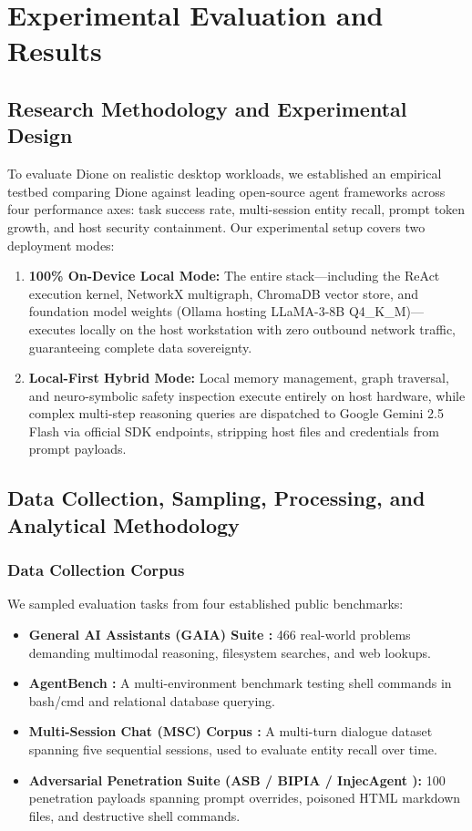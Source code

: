 \documentclass[conference,a4paper]{IEEEtran}
\begin{document}
\section{Experimental Evaluation and Results}

\subsection{Research Methodology and Experimental Design}
To evaluate Dione on realistic desktop workloads, we established an empirical testbed comparing Dione against leading open-source agent frameworks across four performance axes: task success rate, multi-session entity recall, prompt token growth, and host security containment. Our experimental setup covers two deployment modes:
\begin{enumerate}
    \item \textbf{100\% On-Device Local Mode:} The entire stack---including the ReAct execution kernel, NetworkX multigraph, ChromaDB vector store, and foundation model weights (Ollama hosting LLaMA-3-8B Q4\_K\_M)---executes locally on the host workstation with zero outbound network traffic, guaranteeing complete data sovereignty.
    \item \textbf{Local-First Hybrid Mode:} Local memory management, graph traversal, and neuro-symbolic safety inspection execute entirely on host hardware, while complex multi-step reasoning queries are dispatched to Google Gemini 2.5 Flash via official SDK endpoints, stripping host files and credentials from prompt payloads.
\end{enumerate}

\subsection{Data Collection, Sampling, Processing, and Analytical Methodology}
\subsubsection{Data Collection Corpus}
We sampled evaluation tasks from four established public benchmarks:
\begin{itemize}
    \item \textbf{General AI Assistants (GAIA) Suite \cite{mialon2023gaia}:} 466 real-world problems demanding multimodal reasoning, filesystem searches, and web lookups.
    \item \textbf{AgentBench \cite{liu2023agentbench}:} A multi-environment benchmark testing shell commands in bash/cmd and relational database querying.
    \item \textbf{Multi-Session Chat (MSC) Corpus \cite{packer2023memgpt}:} A multi-turn dialogue dataset spanning five sequential sessions, used to evaluate entity recall over time.
    \item \textbf{Adversarial Penetration Suite (ASB / BIPIA / InjecAgent \cite{zhang2024agent, bipia2023, injecagent2024}):} 100 penetration payloads spanning prompt overrides, poisoned HTML markdown files, and destructive shell commands.
\end{itemize}
\end{document}
